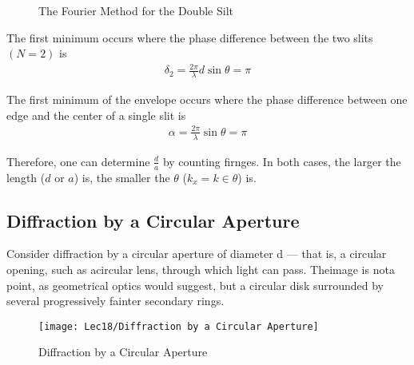 \begin{figure}[H]
    \centering
    \caption{The Fourier Method for the Double Silt}
\end{figure}

The first minimum occurs where the phase difference
between the two slits $(N = 2)$ is 
\begin{align*}
    \delta_2=\frac{2\pi}{\lambda}d\sin\theta=\pi
\end{align*}

The first minimum of the envelope occurs where the phase
difference between one edge and the center of a single slit
is 
\begin{align*}
    \alpha=\frac{2\pi}{\lambda}\sin\theta=\pi
\end{align*}

Therefore, one can determine $\frac{d}{a}$ by counting firnges. In both cases, the larger the length ($d$ or $a$) is, the smaller the $\theta$ ($k_x=k\in\theta$) is. 

\subsection{Diffraction by a Circular Aperture}

Consider diffraction by a circular aperture of diameter d --- that is, a circular opening,  such as acircular lens, through which light can pass. Theimage is nota point, as geometrical optics would suggest,  but a circular disk surrounded by several progressively fainter secondary rings.

\begin{figure}[H]
    \centering
    \texttt{[image: Lec18/Diffraction by a Circular Aperture]}
    \caption{Diffraction by a Circular Aperture}
\end{figure}

